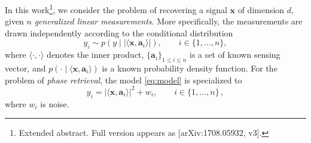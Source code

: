 \documentclass[final,12pt]{colt2018}
\def\ba{{\boldsymbol a}}
\def\bx{{\boldsymbol x}}
\begin{document}

In this work\footnote{Extended abstract. Full version appears as [arXiv:1708.05932, v3].}, we consider the problem of recovering a signal $\bx$ of dimension $d$, given $n$ \emph{generalized linear measurements}. More specifically, the measurements are drawn independently according to the conditional distribution
\begin{equation}\label{eq:model}
y_i\sim p(y\mid |\langle\bx, \ba_i \rangle|), \qquad i\in\{1, \ldots, n\},
\end{equation}
where $\langle\cdot, \cdot\rangle$ denotes the inner product, $\{\ba_i\}_{1\le i\le n}$ is a set of known sensing vector, and $p(\cdot \mid \langle\bx, \ba_i \rangle)$ is a known probability density function. For the problem of \emph{phase retrieval}, the model \eqref{eq:model} is specialized to 
\begin{equation}\label{eq:phretr}
y_i = |\langle\bx, \ba_i\rangle|^2+w_i, \qquad i\in\{1, \ldots, n\}\, ,
\end{equation}
where $w_i$ is noise. 
 
\end{document}

